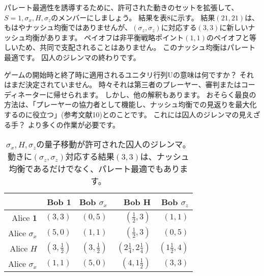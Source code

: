 パレート最適性を誘導するために、許可された動きのセットを拡張して、$S = {1, \sigma_x, H, \sigma_z}$のメンバーにしましょう。 結果を表8に示す。 結果$(21,21)$は、もはやナッシュ均衡ではありませんが、$(\sigma_z,\sigma_z)$に対応する$(3,3)$に新しいナッシュ均衡があります。 ペイオフは非平衡戦略ポイント$(1,1)$のペイオフと等しいため、共同で支配されることはありません。 このナッシュ均衡はパレート最適です。 囚人のジレンマの終わりです。


ゲームの開始時と終了時に適用されるユニタリ行列Uの意味は何ですか？ それはまだ決定されていません。 時々それは第三者のプレーヤー、審判またはコーディネーターに帰せられます。 しかし、他の解釈もあります。 おそらく最良の方法は、「プレーヤーの協力者として機能し、ナッシュ均衡での見返りを最大化するのに役立つ」(参考文献10)とのことです。 これには囚人のジレンマの見えざる手？ より多くの作業が必要です。\\

\begin{table}[htb]
\caption{$\sigma_x , H, \sigma_z$の量子移動が許可された囚人のジレンマ。 動きに$(\sigma_z,\sigma_z)$対応する結果$(3,3)$は、ナッシュ均衡であるだけでなく、パレート最適でもあります。}
\centering
\begin{tabular}{|r|r|r|r|r|} \hline
 & Bob $\mathbf{1}$  & Bob $\sigma_x$ & Bob H　& Bob $\sigma_z$  \\ \hline
Alice $\mathbf{1}$ & $(3,3)$ & $(0,5)$ & $(\frac{1}{2},3)$ & $(1,1)$ \\
Alice $\sigma_x$ & $(5,0)$ & $(1,1)$ & $(\frac{1}{2},3)$ & $(0,5)$  \\ 
Alice $H$ & $(3,\frac{1}{2})$ & $(3,\frac{1}{2})$ & $(2 \frac{1}{4},2 \frac{1}{4})$ & $(1 \frac{1}{2},4)$\\ 
Alice $\sigma_x$ & $(1,1)$ & $(5,0)$ & $(4,1 \frac{1}{2})$ & $(3,3)$  \\ \hline
\end{tabular}
\end{table} 



